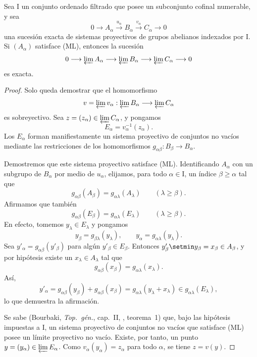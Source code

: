 \documentclass[oneside]{amsart}
\renewcommand{\geq}{\geqslant}
\let\EGAOriginalLabel\label
\renewcommand{\label}[1]{\phantomsection\EGAOriginalLabel{#1}}
\begin{document}
\begin{proposition}[13.2.2]
\label{0.13.2.2}
Sea $\mathrm{I}$ un conjunto ordenado filtrado que posee un subconjunto
cofinal numerable, y sea
\[
  0\longrightarrow A_\alpha
  \xrightarrow{u_\alpha}B_\alpha
  \xrightarrow{v_\alpha}C_\alpha
  \longrightarrow0
\]
una sucesión exacta de sistemas proyectivos de grupos abelianos indexados
por $\mathrm{I}$.
Si $(A_\alpha)$ satisface {\rm(ML)}, entonces la sucesión
\[
  0\longrightarrow\varprojlim A_\alpha
  \longrightarrow\varprojlim B_\alpha
  \longrightarrow\varprojlim C_\alpha
  \longrightarrow0
\]
es exacta.
\end{proposition}

\begin{proof}
Solo queda demostrar que el homomorfismo
\[
  v=\varprojlim v_\alpha:
  \varprojlim B_\alpha\longrightarrow\varprojlim C_\alpha
\]
es sobreyectivo.
Sea $z=(z_\alpha)\in\varprojlim C_\alpha$, y pongamos
\[
  E_\alpha=v_\alpha^{-1}(z_\alpha).
\]
Los $E_\alpha$ forman manifiestamente un sistema proyectivo de conjuntos no
vacíos mediante las restricciones de los homomorfismos
$g_{\alpha\beta}:B_\beta\longrightarrow B_\alpha$.

Demostremos que este sistema proyectivo satisface (ML).
Identificando $A_\alpha$ con un subgrupo de $B_\alpha$ por medio de
$u_\alpha$, elijamos, para todo $\alpha\in\mathrm{I}$, un índice
$\beta\geq\alpha$ tal que
\[
  g_{\alpha\beta}(A_\beta)
  =
  g_{\alpha\lambda}(A_\lambda)
  \qquad(\lambda\geq\beta).
\]
Afirmamos que también
\[
  g_{\alpha\beta}(E_\beta)
  =
  g_{\alpha\lambda}(E_\lambda)
  \qquad(\lambda\geq\beta).
\]
En efecto, tomemos $y_\lambda\in E_\lambda$ y pongamos
\[
  y_\beta=g_{\beta\lambda}(y_\lambda),
  \qquad
  y_\alpha=g_{\alpha\lambda}(y_\lambda).
\]
Sea $y'_\alpha=g_{\alpha\beta}(y'_\beta)$ para algún
$y'_\beta\in E_\beta$.
Entonces $y'_\beta\setmin y_\beta=x_\beta\in A_\beta$, y por hipótesis existe
un $x_\lambda\in A_\lambda$ tal que
\[
  g_{\alpha\beta}(x_\beta)
  =
  g_{\alpha\lambda}(x_\lambda).
\]
Así,
\[
  y'_\alpha
  =
  g_{\alpha\beta}(y_\beta)+g_{\alpha\beta}(x_\beta)
  =
  g_{\alpha\lambda}(y_\lambda+x_\lambda)
  \in g_{\alpha\lambda}(E_\lambda),
\]
lo que demuestra la afirmación.

Se sabe (Bourbaki, \emph{Top.\ g\'{e}n.}, cap.~II,
, teorema~1) que, bajo las hipótesis impuestas a
$\mathrm{I}$, un sistema proyectivo de conjuntos no vacíos que satisface (ML)
posee un límite proyectivo no vacío.
Existe, por tanto, un punto
$y=(y_\alpha)\in\varprojlim E_\alpha$.
Como $v_\alpha(y_\alpha)=z_\alpha$ para todo $\alpha$, se tiene
$z=v(y)$.
\end{proof}
\end{document}
